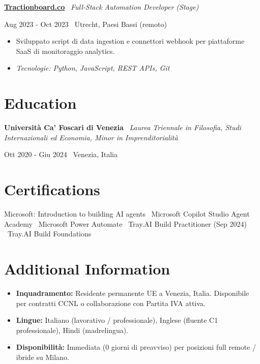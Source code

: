 \documentclass[a4paper,10pt]{article}
\newcommand{\role}[4]{%
  \vspace{2pt}\noindent
  \begin{minipage}[t]{0.70\textwidth}\raggedright\textbf{#1} \textbullet\ \textit{#3}\end{minipage}%
  \hfill
  \begin{minipage}[t]{0.28\textwidth}\raggedleft\footnotesize\color{gray}#2 \textbullet\ #4\end{minipage}%
  \vspace{1pt}%
}
\begin{document}
\role{\href{https://tractionboard.co}{Tractionboard.co}}{Aug 2023 - Oct 2023}{Full-Stack Automation Developer (Stage)}{Utrecht, Paesi Bassi (remoto)}
\begin{itemize}
  \item Sviluppato script di data ingestion e connettori webhook per piattaforme SaaS di monitoraggio analytics.
  \item \textit{Tecnologie: Python, JavaScript, REST APIs, Git}
\end{itemize}

\section{Education}
\role{Università Ca' Foscari di Venezia}{Ott 2020 - Giu 2024}{Laurea Triennale in Filosofia, Studi Internazionali ed Economia, Minor in Imprenditorialità}{Venezia, Italia}

\section{Certifications}
Microsoft: Introduction to building AI agents \textbullet\ Microsoft Copilot Studio Agent Academy \textbullet\ Microsoft Power Automate \textbullet\ Tray.AI Build Practitioner (Sep 2024) \textbullet\ Tray.AI Build Foundations

\section{Additional Information}
\begin{itemize}
  \item \textbf{Inquadramento:} Residente permanente UE a Venezia, Italia. Disponibile per contratti CCNL o collaborazione con Partita IVA attiva.
  \item \textbf{Lingue:} Italiano (lavorativo / professionale), Inglese (fluente C1 professionale), Hindi (madrelingua).
  \item \textbf{Disponibilità:} Immediata (0 giorni di preavviso) per posizioni full remote / ibride su Milano.
\end{itemize}

\end{document}
